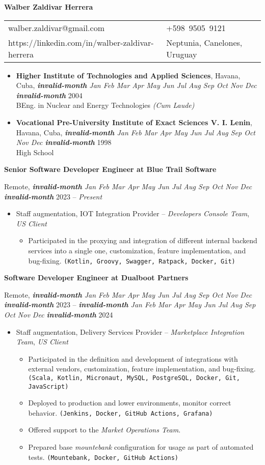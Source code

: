 \documentclass[a4paper]{article}
\newcommand{\cvauthorvar}{}
\newcommand{\cvtitlelocationvar}{}
\newcommand{\cvlinkedinvar}{}
\newcommand{\cvemailvar}{}
\newcommand{\cvphonevar}{}
\newcommand{\cvauthor}[1]{\renewcommand{\cvauthorvar}{#1}}
\newcommand{\cvtitlelocation}[1]{\renewcommand{\cvtitlelocationvar}{#1}}
\newcommand{\cvlinkedin}[1]{\renewcommand{\cvlinkedinvar}{https://linkedin.com/in/#1}}
\newcommand{\cvemail}[1]{\renewcommand{\cvemailvar}{#1}}
\newcommand{\cvphone}[1]{\renewcommand{\cvphonevar}{#1}}
\newcommand{\cvtitle}{
  \begin{center}
    {\Large\textbf{\cvauthorvar}}
    \vspace{8pt}
    
    \begin{tabular}{ll}
      \cvemailvar & \cvphonevar \\
      \cvlinkedinvar & \cvtitlelocationvar
    \end{tabular}
  \end{center}
}
\newcommand{\invalidmonth}{\emph{\textbf{invalid-month}}}
\newcommand{\cvmonth}[1]{
  \ifcase#1 \invalidmonth
    \or Jan
    \or Feb
    \or Mar
    \or Apr
    \or May
    \or Jun
    \or Jul
    \or Aug
    \or Sep
    \or Oct
    \or Nov
    \or Dec
  \else
    \invalidmonth
  \fi
}
\newcommand{\cvdate}[2]{
  \emph{\cvmonth{#1}} {#2}
}
\newcommand{\cvposition}[2]{
  \noindent\textbf{#1 at #2}\par
}
\newcommand{\present}{
  \emph{Present}
}
\newcommand{\cvlocation}[3]{
  \noindent #1, #2 -- #3\par
}
\newenvironment{cveducation}{
  \noindent{\large\textbf{Education:}}
  \begin{itemize}
}{
  \end{itemize}
  \bigskip
}
\newcommand{\cveducationitem}[4]{
  \item \textbf{#1}, #2, #3 \\#4
}
\newenvironment{cvexperience}{
  \noindent{\large\textbf{Work Experience:}}
  \medskip
}{
  \bigskip
}
\newenvironment{cvjob}{
  \begin{sloppypar}
}{
  \end{sloppypar}
  \bigskip
}
\newcommand{\cvskills}[1]{\texttt{(#1)}}
\begin{document}
\cvauthor{Walber Zaldivar Herrera}
\cvtitlelocation{Neptunia, Canelones, Uruguay}
\cvlinkedin{walber-zaldivar-herrera}
\cvphone{+598~9505~9121}
\cvemail{walber.zaldivar@gmail.com}

\cvtitle

\begin{cveducation}
  \cveducationitem{Higher Institute of Technologies and Applied Sciences}
  {Havana, Cuba}{\cvdate{7}{2004}}
  {BEng. in Nuclear and Energy Technologies \emph{(Cum Laude)}}

  \cveducationitem{Vocational Pre-University Institute of Exact Sciences V. I. Lenin}
  {Havana, Cuba}{\cvdate{7}{1998}}
  {High School}
\end{cveducation}

\begin{cvexperience}

  \begin{cvjob}
    \cvposition{Senior Software Developer Engineer}{Blue Trail Software}
    \cvlocation{Remote}{\cvdate{4}{2023}}{\present}
    \begin{itemize}
      \item Staff augmentation, IOT Integration Provider -- \emph{Developers Console Team}, \emph{US Client}
      \begin{itemize}
        \item Participated in the proxying and integration of different internal backend services into a single one, customization, 
        feature implementation, and bug-fixing. \cvskills{Kotlin, Groovy, Swagger, Ratpack, Docker, Git}
      \end{itemize}
    \end{itemize}
  \end{cvjob}

  \begin{cvjob}
    \cvposition{Software Developer Engineer}{Dualboot Partners}
    \cvlocation{Remote}{\cvdate{6}{2023}}{\cvdate{2}{2024}}
    \begin{itemize}
      \item Staff augmentation, Delivery Services Provider -- \emph{Marketplace Integration Team}, \emph{US Client}
      \begin{itemize}
        \item Participated in the definition and development of integrations with external vendors, customization, 
        feature implementation, and bug-fixing. \cvskills{Scala, Kotlin, Micronaut, MySQL, PostgreSQL, Docker, Git, JavaScript}
        \item Deployed to production and lower environments, monitor correct behavior. 
        \cvskills{Jenkins, Docker, GitHub Actions, Grafana}
        \item Offered support to the \emph{Market Operations Team}.
        \item Prepared base \emph{mountebank} configuration for usage as part of automated tests. \cvskills{Mountebank, Docker, GitHub Actions}
      \end{itemize}
    \end{itemize}
  \end{cvjob}
  

\end{cvexperience}
\end{document}
